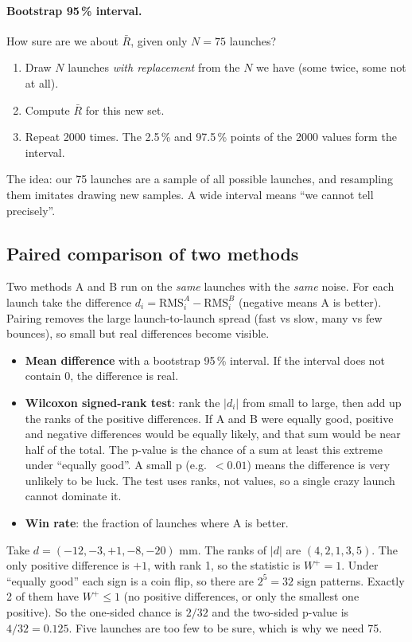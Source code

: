 \documentclass[11pt,a4paper]{article}
\begin{document}
\paragraph{Bootstrap 95\,\% interval.} How sure are we about $\bar R$, given only $N=75$ launches?
\begin{enumerate}
\item Draw $N$ launches \emph{with replacement} from the $N$ we have (some twice, some not at all).
\item Compute $\bar R$ for this new set.
\item Repeat 2000 times. The 2.5\,\% and 97.5\,\% points of the 2000 values form the interval.
\end{enumerate}
The idea: our 75 launches are a sample of all possible launches, and resampling them imitates drawing new samples.
A wide interval means ``we cannot tell precisely''.

\subsection{Paired comparison of two methods}
Two methods A and B run on the \emph{same} launches with the \emph{same} noise. For each launch take the difference
$d_i=\mathrm{RMS}_i^{A}-\mathrm{RMS}_i^{B}$ (negative means A is better). Pairing removes the large launch-to-launch
spread (fast vs slow, many vs few bounces), so small but real differences become visible.
\begin{itemize}
\item \textbf{Mean difference} with a bootstrap 95\,\% interval. If the interval does not contain 0, the difference is real.
\item \textbf{Wilcoxon signed-rank test}: rank the $|d_i|$ from small to large, then add up the ranks of the positive
  differences. If A and B were equally good, positive and negative differences would be equally likely, and that sum
  would be near half of the total. The p-value is the chance of a sum at least this extreme under ``equally good''. A small
  p (e.g.\ $<0.01$) means the difference is very unlikely to be luck. The test uses ranks, not values, so a single crazy
  launch cannot dominate it.
\item \textbf{Win rate}: the fraction of launches where A is better.
\end{itemize}

\begin{example}
Take $d=(-12,-3,+1,-8,-20)$ mm. The ranks of $|d|$ are $(4,2,1,3,5)$. The only positive difference is $+1$, with rank 1,
so the statistic is $W^+=1$. Under ``equally good'' each sign is a coin flip, so there are $2^5=32$ sign patterns.
Exactly 2 of them have $W^+\le1$ (no positive differences, or only the smallest one positive). So the one-sided chance
is $2/32$ and the two-sided p-value is $4/32=0.125$. Five launches are too few to be sure, which is why we need 75.
\end{example}
\end{document}
